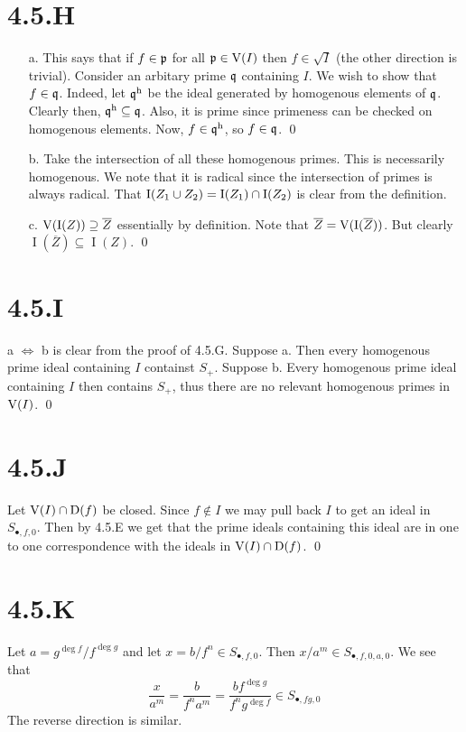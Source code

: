 \documentclass{article}
\begin{document}
\section{4.5.H}
\begin{itemize}
    \item[a.] This says that if $f \in \mathfrak{p}$ for all $\mathfrak{p} \in \operatorname{V}(I)$ then $f \in \sqrt{I}$ (the other direction is trivial). Consider an arbitary prime $\mathfrak{q}$ containing $I$. We wish to show that $f \in \mathfrak{q}$. Indeed, let $\mathfrak{q}^{\text{h}}$ be the ideal generated by homogenous elements of $\mathfrak{q}$. Clearly then, $\mathfrak{q}^{\text{h}} \subseteq \mathfrak{q}$. Also, it is prime since primeness can be checked on homogenous elements. Now, $f \in \mathfrak{q}^{\text{h}}$, so $f \in \mathfrak{q}$. \qed
    \item[b.] Take the intersection of all these homogenous primes. This is necessarily homogenous. We note that it is radical since the intersection of primes is always radical. That $\operatorname{I}(Z_1 \cup Z_2) = \operatorname{I}(Z_1) \cap \operatorname{I}(Z_2)$ is clear from the definition.
    \item[c.] $\operatorname{V}(\operatorname{I}(Z)) \supseteq \overline{Z}$ essentially by definition. Note that $\overline{Z}=\operatorname{V}(\operatorname{I}(\overline{Z}))$. But clearly $\operatorname{I}(\overline{Z}) \subseteq \operatorname{I}(Z)$. \qed
\end{itemize}

\section{4.5.I}
a $\iff$ b is clear from the proof of 4.5.G. Suppose a. Then every homogenous prime ideal containing $I$ containst $S_+$. Suppose b. Every homogenous prime ideal containing $I$ then contains $S_+$, thus there are no relevant homogenous primes in $\operatorname{V}(I)$. \qed

\section{4.5.J}
Let $\operatorname{V}(I) \cap \operatorname{D}(f)$ be closed. Since $f \notin I$ we may pull back $I$ to get an ideal in $S_{\bullet, f, 0}$. Then by 4.5.E we get that the prime ideals containing this ideal are in one to one correspondence with the ideals in $\operatorname{V}(I) \cap \operatorname{D}(f)$. \qed

\section{4.5.K}
Let $a=g^{\deg f}/f^{\deg g}$ and let $x = b/f^n \in S_{\bullet, f, 0}$. Then $x/a^m \in S_{\bullet, f, 0, a, 0}$. We see that
\[
    \frac{x}{a^m} = \frac{b}{f^na^m} = \frac{bf^{\deg g}}{f^ng^{\deg f}} \in S_{\bullet, fg, 0}
\]
The reverse direction is similar.
\end{document}
